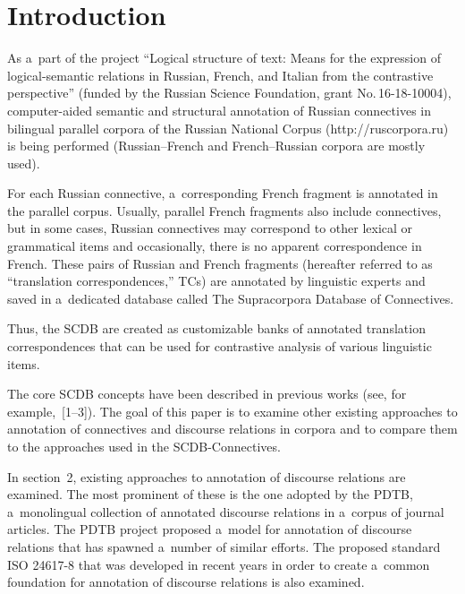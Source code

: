       \begin{multicols}{2}

                  \label{st\stat}
  
  \section{Introduction}
  
  \noindent
  As a~part of the project ``Logical structure of text: Means for the expression of 
logical-semantic relations in Russian, French, and Italian from the contrastive 
perspective'' (funded by the Russian Science Foundation, grant No.\,16-18-10004), 
computer-aided semantic and structural annotation of Russian connectives in 
bilingual parallel corpora of the Russian National Corpus ({\sf http://ruscorpora.ru}) is 
being performed (Russian--French and French--Russian corpora are mostly used). 
{

}

For 
each Russian connective, a~corresponding French fragment is annotated in the 
parallel corpus. Usually, parallel French fragments also include connectives, but in 
some cases, Russian connectives may correspond to other lexical or grammatical 
items and occasionally, there is no apparent correspondence in French. These pairs of 
Russian and French fragments (hereafter referred to as ``translation 
correspondences,'' TCs) are annotated by linguistic experts and saved in a~dedicated 
database called The Supracorpora Database of Connectives.
  
  Thus, the SCDB are created as customizable banks of 
annotated translation correspondences that can be used for contrastive analysis of 
various linguistic items. 
{

}

The core SCDB concepts have been described in previous 
works (see, for example,~[1--3]). The goal of this paper is to examine other existing approaches 
to annotation of connectives and discourse relations in corpora and to compare them 
to the approaches used in the SCDB-Connectives. 

In section~2, existing approaches to 
annotation of discourse relations are examined. The most prominent of these is the 
one adopted by the PDTB, a~monolingual collection of 
annotated discourse relations in a~corpus of journal articles. 
The PDTB project proposed 
a~model for annotation of discourse relations that has spawned a~number of similar 
efforts. The proposed standard ISO 24617-8 that was developed in recent years in 
order to create a~common foundation for annotation of discourse relations is also 
examined.


\end{multicols}
